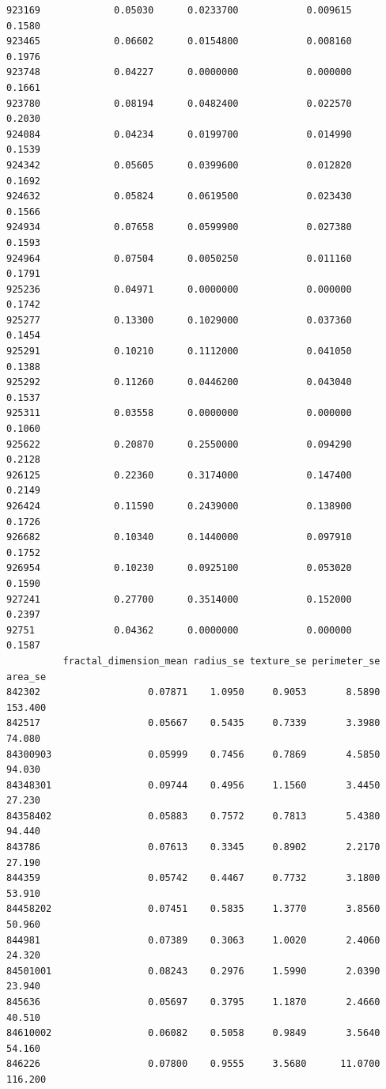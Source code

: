 \documentclass[
  letterpaper,
  DIV=11,
  numbers=noendperiod]{scrartcl}
\begin{document}
\begin{verbatim}
923169             0.05030      0.0233700            0.009615        0.1580
923465             0.06602      0.0154800            0.008160        0.1976
923748             0.04227      0.0000000            0.000000        0.1661
923780             0.08194      0.0482400            0.022570        0.2030
924084             0.04234      0.0199700            0.014990        0.1539
924342             0.05605      0.0399600            0.012820        0.1692
924632             0.05824      0.0619500            0.023430        0.1566
924934             0.07658      0.0599900            0.027380        0.1593
924964             0.07504      0.0050250            0.011160        0.1791
925236             0.04971      0.0000000            0.000000        0.1742
925277             0.13300      0.1029000            0.037360        0.1454
925291             0.10210      0.1112000            0.041050        0.1388
925292             0.11260      0.0446200            0.043040        0.1537
925311             0.03558      0.0000000            0.000000        0.1060
925622             0.20870      0.2550000            0.094290        0.2128
926125             0.22360      0.3174000            0.147400        0.2149
926424             0.11590      0.2439000            0.138900        0.1726
926682             0.10340      0.1440000            0.097910        0.1752
926954             0.10230      0.0925100            0.053020        0.1590
927241             0.27700      0.3514000            0.152000        0.2397
92751              0.04362      0.0000000            0.000000        0.1587
          fractal_dimension_mean radius_se texture_se perimeter_se area_se
842302                   0.07871    1.0950     0.9053       8.5890 153.400
842517                   0.05667    0.5435     0.7339       3.3980  74.080
84300903                 0.05999    0.7456     0.7869       4.5850  94.030
84348301                 0.09744    0.4956     1.1560       3.4450  27.230
84358402                 0.05883    0.7572     0.7813       5.4380  94.440
843786                   0.07613    0.3345     0.8902       2.2170  27.190
844359                   0.05742    0.4467     0.7732       3.1800  53.910
84458202                 0.07451    0.5835     1.3770       3.8560  50.960
844981                   0.07389    0.3063     1.0020       2.4060  24.320
84501001                 0.08243    0.2976     1.5990       2.0390  23.940
845636                   0.05697    0.3795     1.1870       2.4660  40.510
84610002                 0.06082    0.5058     0.9849       3.5640  54.160
846226                   0.07800    0.9555     3.5680      11.0700 116.200

\end{verbatim}
\end{document}
